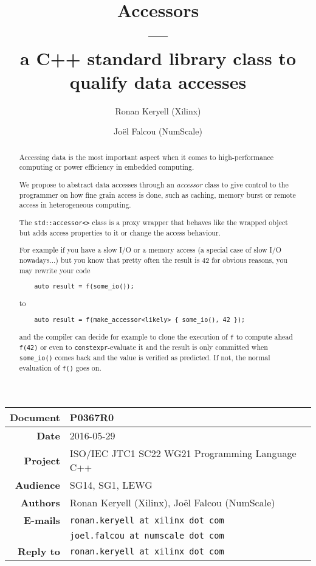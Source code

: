 \documentclass[a4paper]{article}
\title{Accessors\\
  ---\\
  a C++ standard library class to qualify data accesses}
\author{Ronan Keryell (Xilinx)
  \and Joël Falcou (NumScale)}
\begin{document}
\maketitle

\begin{tabular}{|r|l|}
  \hline
  \textbf{Document} & P0367R0\\\hline
  \textbf{Date} & 2016-05-29\\\hline
  \textbf{Project} & ISO/IEC JTC1 SC22 WG21 Programming Language C++\\\hline
  \textbf{Audience} & SG14, SG1, LEWG\\\hline
  \textbf{Authors} &  Ronan Keryell (Xilinx), Joël Falcou (NumScale)\\\hline
  \textbf{E-mails} & \texttt{ronan.keryell at xilinx dot com}\\
                   & \texttt{joel.falcou at numscale dot com}\\\hline
  \textbf{Reply to} & \texttt{ronan.keryell at xilinx dot com}\\\hline
\end{tabular}


\begin{abstract}
  Accessing data is the most important aspect when it comes to
  high-performance computing or power efficiency in embedded
  computing.

  We propose to abstract data accesses through an \emph{accessor}
  class to give control to the programmer on how fine grain access is
  done, such as caching, memory burst or remote access in
  heterogeneous computing.

  The \lstinline|std::accessor<>| class is a proxy wrapper that
  behaves like the wrapped object but adds access properties to it or
  change the access behaviour.

  For example if you have a slow I/O or a memory access (a special
  case of slow I/O nowadays...) but you know that pretty often the
  result is 42 for obvious reasons, you may rewrite your code
  \begin{lstlisting}
    auto result = f(some_io());
  \end{lstlisting}
  to
  \begin{lstlisting}
    auto result = f(make_accessor<likely> { some_io(), 42 });
  \end{lstlisting}
  and the compiler can decide for example to clone the execution of
  \lstinline|f| to compute ahead \lstinline|f(42)| or even to
  \lstinline|constexpr|-evaluate it and the result is only committed
  when \lstinline|some_io()| comes back and the value is verified as
  predicted. If not, the normal evaluation of \lstinline|f()| goes on.
\end{abstract}
\end{document}
